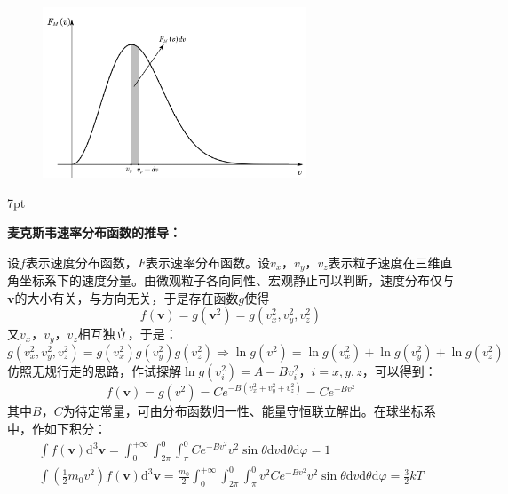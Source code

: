 \documentclass[zihao=-4,UTF8]{report}
\newenvironment{graybox}{%
\def\FrameCommand{%
\hspace{1pt}%
{\color{gray}\small \vrule width 2pt}%
{\color{graybox_color}\vrule width 4pt}%
\colorbox{graybox_color}%
}%
\MakeFramed{\advance\hsize-\width\FrameRestore}%
\noindent\hspace{-4.55pt}%
\begin{adjustwidth}{}{7pt}%
\vspace{2pt}\vspace{2pt}%
}
{%
\vspace{2pt}\end{adjustwidth}\endMakeFramed%
}
\begin{document}
\begin{figure}[H]
    \centering
    \includegraphics[width=0.7\textwidth]{pic/麦克斯韦速率分布函数.pdf}
    \label{麦克斯韦速率分布图}
\end{figure}
\begin{graybox}
    \textbf{麦克斯韦速率分布函数的推导：}\par
    设$f$表示速度分布函数，$F$表示速率分布函数。设$v_x$，$v_y$，$v_z$表示粒子速度在三维直角坐标系下的速度分量。由微观粒子各向同性、宏观静止可以判断，速度分布仅与$\boldsymbol{v}$的大小有关，与方向无关，于是存在函数$g$使得
    \begin{equation}
        f(\boldsymbol{v}) = g(\boldsymbol{v}^2) = g(v_x^2,v_y^2,v_z^2)
    \end{equation}
    又$v_x$，$v_y$，$v_z$相互独立，于是：
    \begin{equation}
        g(v_x^2,v_y^2,v_z^2) = g(v_x^2)g(v_y^2)g(v_z^2)\Longrightarrow \ln g(v^2) = \ln g(v_x^2) + \ln g(v_y^2)+\ln g(v_z^2)
    \end{equation}
    仿照无规行走的思路，作试探解$\ln g(v_i^2) = A-Bv_i^2$，$i = x,y,z$，可以得到：
    \begin{equation}
        f(\boldsymbol{v}) = g(v^2) = Ce^{-B(v_x^2 + v_y^2 +v_z^2)} = Ce^{-Bv^2}
    \end{equation}
    其中$B$，$C$为待定常量，可由分布函数归一性、能量守恒联立解出。在球坐标系中，作如下积分：
    \begin{gather}
        \int f(\boldsymbol{v})\mathrm{d}^3\boldsymbol{v} = \int_{0}^{+\infty} \int_{2\pi}^{0}\int_{\pi}^{0} Ce^{-Bv^2}v^2\sin \theta \mathrm{d}v\mathrm{d}\theta\mathrm{d}\varphi = 1\\
        \int (\frac{1}{2}m_0v^2)f(\boldsymbol{v})\mathrm{d}^3\boldsymbol{v} = \frac{m_0}{2}\int_{0}^{+\infty} \int_{2\pi}^{0}\int_{\pi}^{0} v^2Ce^{-Bv^2}v^2\sin \theta \mathrm{d}v\mathrm{d}\theta\mathrm{d}\varphi = \frac{3}{2}kT
    \end{gather}

\end{graybox}
\end{document}
